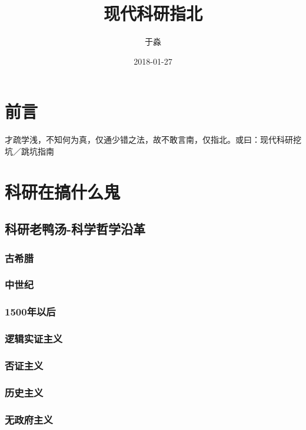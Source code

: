 \documentclass[]{book}
\title{现代科研指北}
\author{于淼}
\date{2018-01-27}
\begin{document}
\maketitle

{
\setcounter{tocdepth}{1}
\tableofcontents
}
\chapter{前言}

才疏学浅，不知何为真，仅通少错之法，故不敢言南，仅指北。或曰：现代科研挖坑／跳坑指南

\chapter{科研在搞什么鬼}\label{intro}

\section{科研老鸭汤-科学哲学沿革}\label{-}

\subsection{古希腊}

\subsection{中世纪}

\subsection{1500年以后}

\subsection{逻辑实证主义}

\subsection{否证主义}

\subsection{历史主义}

\subsection{无政府主义}
\end{document}
